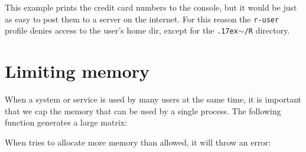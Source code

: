 This example prints the credit card numbers to the console, but it would be
just as easy to post them to a server on the internet. For this reason the
\texttt{r-user} profile denies access to the user's home dir, except for the
\texttt{{\raise.17ex\hbox{$\scriptstyle\sim$}}/R} directory.


\section{Limiting memory}

When a system or service is used by many users at the same time, it is
important that we cap the memory that can be used by a single process. The
following function generates a large matrix:

\begin{knitrout}\mycodesize
{}\color{fgcolor}\begin{kframe}
\begin{alltt}
 \hlkwb{<-} \hlstd{() \{}
     \hlkwb{<-} \hlstd{(}\hlstd{(}\hlstd{),} \hlstd{)}
\hlstd{\}}
\end{alltt}
\end{kframe}
\end{knitrout}


When \R tries to allocate more memory than allowed, it will throw an error:

\begin{knitrout}\mycodesize
{}\color{fgcolor}\begin{kframe}
\begin{alltt}
 \hlkwb{<-} \hlstd{(}\hlstd{(),}  \hlstd{=}  \hlopt{*}  \hlopt{*} \hlstd{)}
\end{alltt}


{\ttfamily\noindent\bfseries\color{errorcolor}{\#\# Error: cannot allocate vector of size 76.3 Mb}}\begin{alltt}
 \hlkwb{<-} \hlstd{(}\hlstd{(),}  \hlstd{=}  \hlopt{*}  \hlopt{*} \hlstd{)}
\end{alltt}


{\ttfamily\noindent\bfseries\color{errorcolor}{\#\# Error: R call did not return within 60 seconds. Terminating process.}}\end{kframe}
\end{knitrout}



